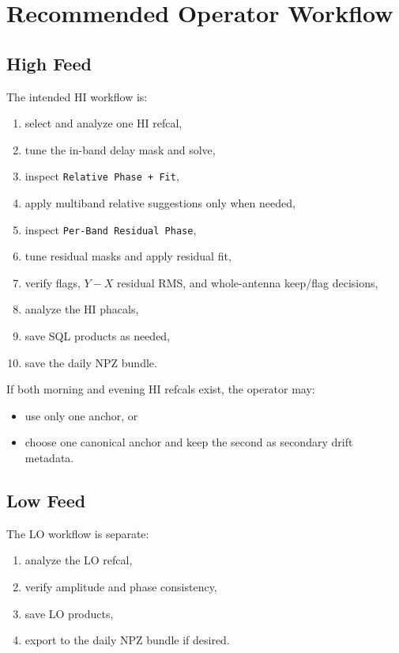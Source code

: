 \documentclass[11pt]{article}
\begin{document}
\section{Recommended Operator Workflow}

\subsection{High Feed}

The intended HI workflow is:
\begin{enumerate}[leftmargin=1.5em]
  \item select and analyze one HI refcal,
  \item tune the in-band delay mask and solve,
  \item inspect \texttt{Relative Phase + Fit},
  \item apply multiband relative suggestions only when needed,
  \item inspect \texttt{Per-Band Residual Phase},
  \item tune residual masks and apply residual fit,
  \item verify flags, $Y-X$ residual RMS, and whole-antenna keep/flag decisions,
  \item analyze the HI phacals,
  \item save SQL products as needed,
  \item save the daily NPZ bundle.
\end{enumerate}

If both morning and evening HI refcals exist, the operator may:
\begin{itemize}[leftmargin=1.5em]
  \item use only one anchor, or
  \item choose one canonical anchor and keep the second as secondary drift
  metadata.
\end{itemize}

\subsection{Low Feed}

The LO workflow is separate:
\begin{enumerate}[leftmargin=1.5em]
  \item analyze the LO refcal,
  \item verify amplitude and phase consistency,
  \item save LO products,
  \item export to the daily NPZ bundle if desired.
\end{enumerate}
\end{document}
